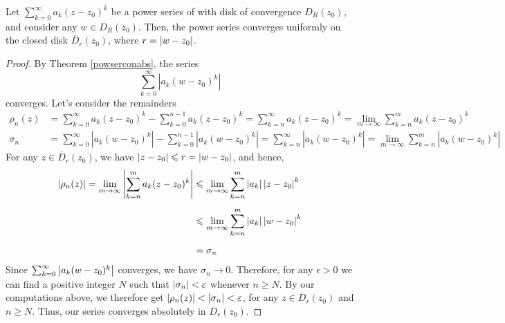 \vspace*{1em}

\begin{theorem}
Let $\sum_{k=0}^\infty a_k(z - z_0)^k$ be a power series of with disk of convergence $D_R(z_0)$, and consider any $w \in D_R(z_0)$. Then, the power series converges uniformly on the closed disk $\overline{D}_r(z_0)$, where $r = \left\lvert w - z_0\right\rvert$.
\end{theorem}
\begin{proof}
By Theorem \ref{powserconabs}, the series
\[\sum_{k=0}^\infty|a_k(w - z_0)^k|\]
converges. Let's consider the remainders
\begin{align*}
\rho_n(z) &= \sum_{k=0}^\infty a_k(z - z_0)^k - \sum_{k=0}^{n-1} a_k(z - z_0)^k = \sum_{k=n}^\infty a_k(z - z_0)^k = \lim_{m \to \infty}\sum_{k=n}^m a_k(z - z_0)^k\\[0.5em]
\sigma_n &= \sum_{k=0}^\infty |a_k(w - z_0)^k| - \sum_{k=0}^{n-1} |a_k(w - z_0)^k| = \sum_{k=n}^\infty |a_k(w - z_0)^k| = \lim_{m \to \infty}\sum_{k=n}^m |a_k(w - z_0)^k|
\end{align*}
For any $z \in \overline{D}_r(z_0)$, we have $\left\lvert z - z_0\right\rvert \leqslant r = \left\lvert w - z_0\right\rvert$, and hence, 
\begin{align*}
\left\lvert\rho_n(z)\right\rvert = \lim_{m \to \infty} \left\lvert\sum_{k=n}^m a_k(z - z_0)^k\right\rvert &\leqslant \lim_{m \to \infty} \sum_{k=n}^m \left\lvert a_k\right\rvert\left\lvert z - z_0\right\rvert^k\\[0.5em]
 &\leqslant \lim_{m \to \infty} \sum_{k=n}^m \left\lvert a_k\right\rvert\left\lvert w - z_0\right\rvert^k\\[0.5em]
 &= \sigma_n
\end{align*}
Since $\sum_{k=0}^\infty\left\lvert a_k(w - z_0)^k\right\rvert$ converges, we have $\sigma_n \to 0$. Therefore, for any $\epsilon > 0$ we can find a positive integer $N$ such that $\left\lvert\sigma_n\right\rvert < \varepsilon$ whenever $n \geq N$. By our computations above, we therefore get $\left\lvert\rho_n(z)\right\rvert < \left\lvert\sigma_n\right\rvert < \varepsilon$, for any $z \in \overline{D}_r(z_0)$ and $n \geq N$. Thus, our series converges absolutely in $\overline{D}_r(z_0)$.
\end{proof}

\vspace*{1em}

